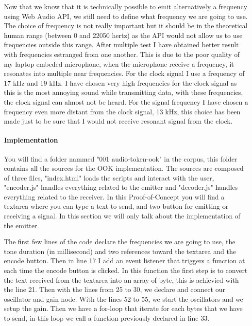 \documentclass[twocolumn,14pt]{extarticle}
\begin{document}
Now that we know that it is technically possible to emit alternatively a frequency using Web Audio API, we still need to define what frequency we are going to use. The choice of frequency is not really important but it should be in the theoretical human range (between 0 and 22050 hertz) as the API would not allow us to use frequencies outside this range. After multiple test I have obtained better result with frequencies estranged from one another. This is due to the poor quality of my laptop embeded microphone, when the microphone receive a frequency, it resonates into multiple near frequencies. For the clock signal I use a frequency of 17 kHz and 19 kHz. I have chosen very high frequencies for the clock signal as this is the most annoying sound while transmitting data, with these frequencies, the clock signal can almost not be heard. For the signal frequency I have chosen a frequency even more distant from the clock signal, 13 kHz, this choice has been made just to be sure that I would not receive resonant signal from the clock.

\paragraph{Implementation}
You will find a folder nammed "001 audio-token-ook" in the corpus, this folder contains all the sources for the OOK implementation. The sources are composed of three files, "index.html" loads the scripts and interact with the user, "encoder.js" handles everything related to the emitter and "decoder.js" handles everything related to the receiver. In this Proof-of-Concept you will find a textarea where you can type a text to send, and two button for emitting or receiving a signal. In this section we will only talk about the implementation of the emitter.

The first few lines of the code declare the frequencies we are going to use, the tone duration (in millisecond) and two references toward the textarea and the encode button. Then in line 17 I add an event listener that triggers a function at each time the encode button is clicked. In this function the first step is to convert the text received from the textarea into an array of byte, this is achievied with the line 21. Then with the lines from 25 to 30, we declare and connect our oscillator and gain node. With the lines 52 to 55, we start the oscillators and we setup the gain. Then we have a for-loop that iterate for each bytes that we have to send, in this loop we call a function previously declared in line 33. 
\end{document}
